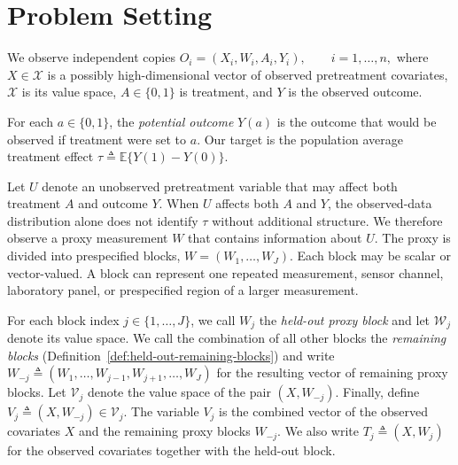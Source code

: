 \section{Problem Setting}
\label{sec:setup}

We observe independent copies
\(O_i=(X_i,W_i,A_i,Y_i), \qquad i=1,\ldots,n,\)
where $X\in\mathcal X$ is a possibly high-dimensional vector of observed pretreatment covariates, $\mathcal X$ is its value space, $A\in\{0,1\}$ is treatment, and $Y$ is the observed outcome.

For each $a\in\{0,1\}$, the \emph{potential outcome} $Y(a)$ is the outcome that would be observed if treatment were set to $a$. Our target is the population average treatment effect
\(\tau\triangleq\mathbb E\{Y(1)-Y(0)\}.\)

Let $U$ denote an unobserved pretreatment variable that may affect both treatment $A$ and outcome $Y$. When $U$ affects both $A$ and $Y$, the observed-data distribution alone does not identify $\tau$ without additional structure. We therefore observe a proxy measurement $W$ that contains information about $U$. The proxy is divided into prespecified blocks,
\(W=(W_1,\ldots,W_J).\)
Each block may be scalar or vector-valued. A block can represent one repeated measurement, sensor channel, laboratory panel, or prespecified region of a larger measurement.

For each block index $j\in\{1,\ldots,J\}$, we call $W_j$ the \emph{held-out proxy block} and let $\mathcal W_j$ denote its value space. We call the combination of all other blocks the \emph{remaining blocks} (Definition~\ref{def:held-out-remaining-blocks}) and write
\(W_{-j} \triangleq (W_1,\ldots,W_{j-1},W_{j+1},\ldots,W_J)\)
for the resulting vector of remaining proxy blocks. Let $\mathcal V_j$ denote the value space of the pair $(X,W_{-j})$. Finally, define
\(V_j\triangleq(X,W_{-j})\in\mathcal V_j.\)
The variable $V_j$ is the combined vector of the observed covariates $X$ and the remaining proxy blocks $W_{-j}$. We also write $T_j\triangleq(X,W_j)$ for the observed covariates together with the held-out block.
